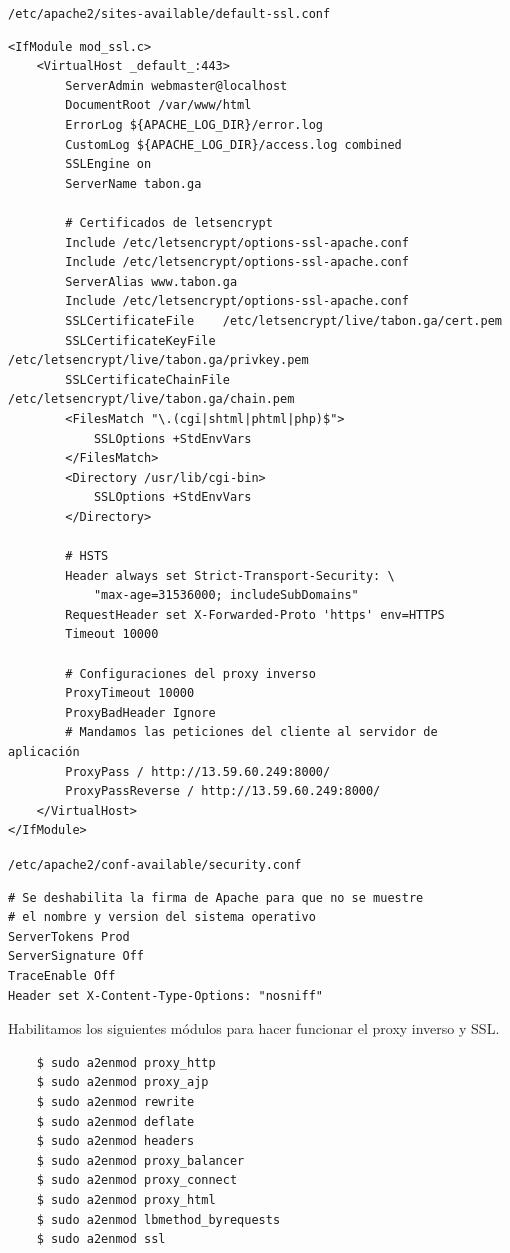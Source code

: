 \documentclass[12pt]{article}
\begin{document}
\texttt{/etc/apache2/sites-available/default-ssl.conf}

\begin{verbatim}
<IfModule mod_ssl.c>
    <VirtualHost _default_:443>
        ServerAdmin webmaster@localhost
        DocumentRoot /var/www/html
        ErrorLog ${APACHE_LOG_DIR}/error.log
        CustomLog ${APACHE_LOG_DIR}/access.log combined
        SSLEngine on
        ServerName tabon.ga

        # Certificados de letsencrypt
        Include /etc/letsencrypt/options-ssl-apache.conf
        Include /etc/letsencrypt/options-ssl-apache.conf
        ServerAlias www.tabon.ga
        Include /etc/letsencrypt/options-ssl-apache.conf
        SSLCertificateFile    /etc/letsencrypt/live/tabon.ga/cert.pem
        SSLCertificateKeyFile    /etc/letsencrypt/live/tabon.ga/privkey.pem
        SSLCertificateChainFile    /etc/letsencrypt/live/tabon.ga/chain.pem
        <FilesMatch "\.(cgi|shtml|phtml|php)$">
            SSLOptions +StdEnvVars
        </FilesMatch>
        <Directory /usr/lib/cgi-bin>
            SSLOptions +StdEnvVars
        </Directory>

        # HSTS
        Header always set Strict-Transport-Security: \
            "max-age=31536000; includeSubDomains"
        RequestHeader set X-Forwarded-Proto 'https' env=HTTPS        
        Timeout 10000

        # Configuraciones del proxy inverso
        ProxyTimeout 10000
        ProxyBadHeader Ignore
        # Mandamos las peticiones del cliente al servidor de aplicación
        ProxyPass / http://13.59.60.249:8000/
        ProxyPassReverse / http://13.59.60.249:8000/
    </VirtualHost>
</IfModule>
\end{verbatim}

\texttt{/etc/apache2/conf-available/security.conf}

\begin{verbatim}
# Se deshabilita la firma de Apache para que no se muestre
# el nombre y version del sistema operativo
ServerTokens Prod
ServerSignature Off
TraceEnable Off
Header set X-Content-Type-Options: "nosniff"
\end{verbatim}

Habilitamos los siguientes módulos para hacer funcionar el proxy inverso y \textsf{SSL}.

\begin{verbatim}
    $ sudo a2enmod proxy_http
    $ sudo a2enmod proxy_ajp
    $ sudo a2enmod rewrite
    $ sudo a2enmod deflate
    $ sudo a2enmod headers
    $ sudo a2enmod proxy_balancer
    $ sudo a2enmod proxy_connect
    $ sudo a2enmod proxy_html
    $ sudo a2enmod lbmethod_byrequests
    $ sudo a2enmod ssl
\end{verbatim}
\end{document}

